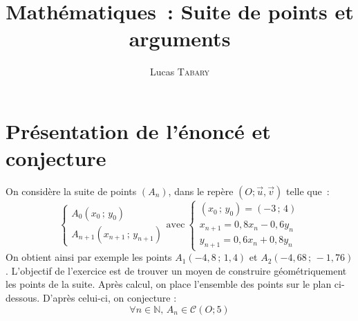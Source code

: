 \documentclass{article}
\title{\textbf{Mathématiques~: Suite de points et arguments}}
\author{Lucas \textsc{Tabary}}
\date{}
\begin{document}
 \maketitle 
 \hrulefill
 
 \vspace{2cm}
 
 \hrulefill
 
\section{Présentation de l'énoncé et conjecture}
On considère la suite de points $(A_n)$, dans le repère $(O;\vec u,\vec v)$ telle que~:
\begin{displaymath}
 \left\{
  \begin{array}{l}
   A_0 (x_0\,;\,y_0) \\
   A_{n+1}(x_{n+1}\,;\,y_{n+1})
  \end{array}
 \right.
 \mathrm{avec}\ 
 \left\{
  \begin{array}{l}
   (x_0\,;\,y_0) = (-3\,;\,4) \\
   x_{n+1} = 0,8x_n - 0,6y_n \\
   y_{n+1} = 0,6x_n + 0,8y_n
  \end{array}
 \right.
\end{displaymath}
On obtient ainsi par exemple les points $A_1(-4,8\,;\,1,4)$ et $A_2(-4,68\,;\,-1,76)$. L'objectif de l'exercice est de trouver un moyen de construire géométriquement les points de la suite. Après calcul, on place l'ensemble des points sur le plan ci-dessous. D'après celui-ci, on conjecture :
\begin{displaymath}
 \forall n \in\mathbb{N},\, A_n \in \mathscr{C}(O;5)
\end{displaymath}
\end{document}
